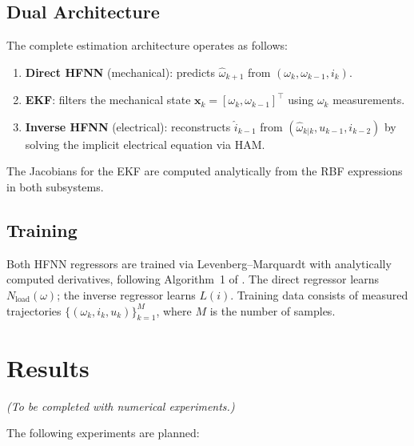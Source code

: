 \documentclass[lettersize,journal]{IEEEtran}
\begin{document}
\subsection{Dual Architecture}

The complete estimation architecture operates as follows:

\begin{enumerate}
    \item \textbf{Direct HFNN} (mechanical): predicts $\hat{\omega}_{k+1}$ from $(\omega_k, \omega_{k-1}, i_k)$.
    \item \textbf{EKF}: filters the mechanical state $\mathbf{x}_k = [\omega_k, \omega_{k-1}]^\top$ using $\omega_k$ measurements.
    \item \textbf{Inverse HFNN} (electrical): reconstructs $\hat{i}_{k-1}$ from $(\hat{\omega}_{k|k}, u_{k-1}, i_{k-2})$ by solving the implicit electrical equation via HAM.
\end{enumerate}

The Jacobians for the EKF are computed analytically from the RBF expressions in both subsystems.

\subsection{Training}

Both HFNN regressors are trained via Levenberg--Marquardt with analytically computed derivatives, following Algorithm~1 of \cite{rodrigo2025hfnn}. The direct regressor learns $N_{\text{load}}(\omega)$; the inverse regressor learns $L(i)$. Training data consists of measured trajectories $\{(\omega_k, i_k, u_k)\}_{k=1}^{M}$, where $M$ is the number of samples.

\section{Results}
\label{sec:results}

\textit{(To be completed with numerical experiments.)}

The following experiments are planned:
\end{document}
